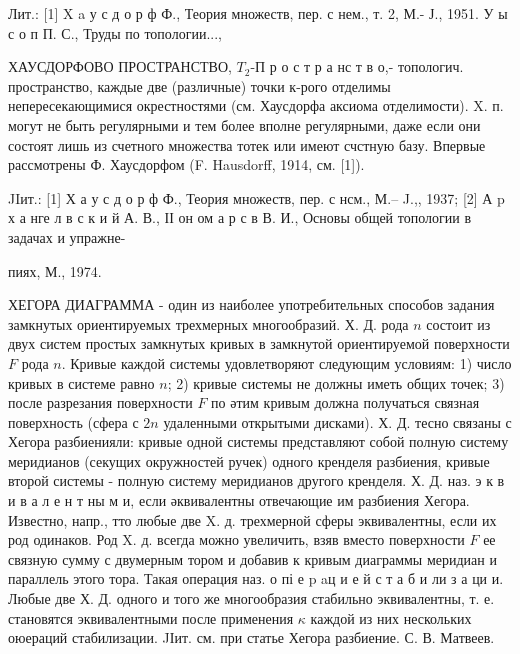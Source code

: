 \documentclass[10pt]{article}
\begin{document}
Лит.: [1] X a у с д о р ф Ф., Теория множеств, пер. с нем., т. 2, М.- Ј., 1951. У ы с о п П. С., Труды по топологии...,



ХАУСДОРФОВО ПРОСТРАНСТВО, $T_{2}$-П р о с т р а нс т в о,- топологич. пространство, каждые две (различные) точки к-рого отделимы непересекающимися окрестностями (см. Хаусдорфа аксиома отделимости). X. п. могут не быть регулярными и тем более вполне регулярными, даже если они состоят лишь из счетного множества тотек или имеют счстную базу. Впервые рассмотрены Ф. Хаусдорфом (F. Hausdorff, 1914, см. [1]).



JIит.: [1] Х а у с д о р ф Ф., Теория множеств, пер. с нсм., М.-- J.,, 1937; [2] А p х а нге л в с к и й А. В., ІІ он ом а р с в В. И., Основы общей топологии в задачах и упражне-

пиях, М., 1974.



ХЕГОРА ДИАГРАММА - один из наиболее употребительных способов задания замкнутых ориентируемых трехмерных многообразий. Х. Д. рода $n$ состоит из двух систем простых замкнутых кривых в замкнутой ориентируемой поверхности $F$ рода $n$. Кривые каждой системы удовлетворяют следующим условиям: 1) число кривых в системе равно $n$; 2) кривые системы не должны иметь общих точек; 3) после разрезания поверхности $F$ по әтим кривым должна получаться связная поверхность (сфера с $2 n$ удаленными открытыми дисками). Х. Д. тесно связаны с Хегора разбиенияли: кривые одной системы представляют собой полную систему меридианов (секущих окружностей ручек) одного кренделя разбиения, кривые второй системы - полную систему меридианов другого кренделя. Х. Д. наз. э к в и в а л е н т ны м и, если әквивалентны отвечающие им разбиения Хегора. Известно, напр., тто любые две X. д. трехмерной сферы эквивалентны, если их род одинаков. Род X. д. всегда можно увеличить, взяв вместо поверхности $F$ ее связную сумму с двумерным тором и добавив к кривым диаграммы меридиан и параллель этого тора. Такая операция наз. о пі е p aц и е й с т а б и ли з а ци и. Любые две Х. Д. одного и того же многообразия стабильно эквивалентны, т. е. становятся эквивалентными после применения $\kappa$ каждой из них нескольких оюераций стабилизации. JІит. см. при статье Хегора разбиение. С. В. Матвеев.
\end{document}
